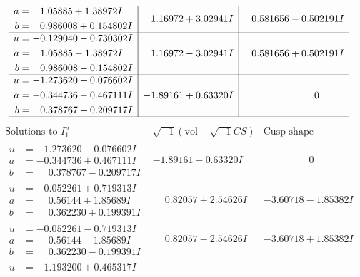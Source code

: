 \documentclass[1p]{elsarticle_modified}
\theoremstyle{definition}
\newcommand{\I}{\sqrt{-1}}
\begin{document}
$$\begin{array}{c|c|c}
\begin{aligned}
a &= \phantom{-}1.05885 + 1.38972 I \\
b &= \phantom{-}0.986008 + 0.154802 I\end{aligned}
 & \phantom{-}1.16972 + 3.02941 I & \phantom{-}0.581656 - 0.502191 I \\ \hline\begin{aligned}
u &= -0.129040 - 0.730302 I \\
a &= \phantom{-}1.05885 - 1.38972 I \\
b &= \phantom{-}0.986008 - 0.154802 I\end{aligned}
 & \phantom{-}1.16972 - 3.02941 I & \phantom{-}0.581656 + 0.502191 I \\ \hline\begin{aligned}
u &= -1.273620 + 0.076602 I \\
a &= -0.344736 - 0.467111 I \\
b &= \phantom{-}0.378767 + 0.209717 I\end{aligned}
 & -1.89161 + 0.63320 I & \phantom{-0.000000 } 0\\
 \hline 
 \end{array}$$\newpage$$\begin{array}{c|c|c}  
\text{Solutions to }I^u_{1}& \I (\text{vol} + \sqrt{-1}CS) & \text{Cusp shape}\\
 \hline 
\begin{aligned}
u &= -1.273620 - 0.076602 I \\
a &= -0.344736 + 0.467111 I \\
b &= \phantom{-}0.378767 - 0.209717 I\end{aligned}
 & -1.89161 - 0.63320 I & \phantom{-0.000000 } 0 \\ \hline\begin{aligned}
u &= -0.052261 + 0.719313 I \\
a &= \phantom{-}0.56144 + 1.85689 I \\
b &= \phantom{-}0.362230 + 0.199391 I\end{aligned}
 & \phantom{-}0.82057 + 2.54626 I & -3.60718 - 1.85382 I \\ \hline\begin{aligned}
u &= -0.052261 - 0.719313 I \\
a &= \phantom{-}0.56144 - 1.85689 I \\
b &= \phantom{-}0.362230 - 0.199391 I\end{aligned}
 & \phantom{-}0.82057 - 2.54626 I & -3.60718 + 1.85382 I \\ \hline\begin{aligned}
u &= -1.193200 + 0.465317 I \\

\end{aligned}
\end{array}$$
\end{document}
